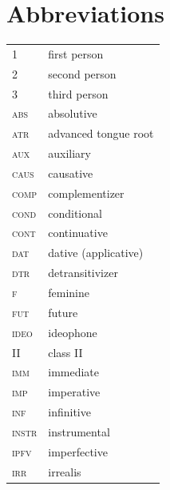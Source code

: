 \documentclass[output=paper,colorlinks,citecolor=brown,draftmode]{langscibook}
\begin{document}
\section*{Abbreviations}


\begin{tabularx}{.45\textwidth}{lQ}
1 & first person\\
2 & second person\\
3 & third person\\
\scshape abs	 & absolutive\\
\scshape atr	 & advanced tongue root\\
\scshape aux	 & auxiliary\\
\scshape caus  & 	causative\\
\scshape comp & 	complementizer\\
\scshape cond  & 	conditional\\
\scshape cont  & 	continuative\\
\scshape dat	 & dative (applicative)\\
\scshape dtr & 	detransitivizer\\
\scshape f & 	feminine \\
\scshape fut & 	future\\
\scshape ideo & 	ideophone\\
\scshape II	 & class II\\
\scshape imm	 & immediate\\
\scshape imp & 	imperative\\
\scshape inf & 	infinitive\\
\scshape instr  & 	instrumental\\
\scshape ipfv & 	imperfective\\
\scshape irr  & 	irrealis\\
\end{tabularx}
\end{document}
